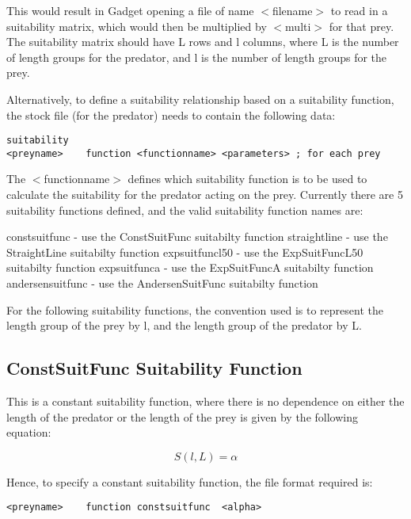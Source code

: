 \documentclass [a4paper, 10pt]{book}
\begin{document}
This would result in Gadget opening a file of name $<$filename$>$ to read in a suitability matrix, which would then be multiplied by $<$multi$>$ for that prey.  The suitability matrix should have L rows and l columns, where L is the number of length groups for the predator, and l is the number of length groups for the prey.

\bigskip
Alternatively, to define a suitability relationship based on a suitability function, the stock file (for the predator) needs to contain the following data:

{\small\begin{verbatim}
suitability
<preyname>    function <functionname> <parameters> ; for each prey
\end{verbatim}}

The $<$functionname$>$ defines which suitability function is to be used to calculate the suitability for the predator acting on the prey.  Currently there are 5 suitability functions defined, and the valid suitability function names are:

\bigskip
constsuitfunc - use the ConstSuitFunc suitabilty function\newline
straightline - use the StraightLine suitabilty function\newline
expsuitfuncl50 - use the ExpSuitFuncL50 suitabilty function\newline
expsuitfunca - use the ExpSuitFuncA suitabilty function\newline
andersensuitfunc - use the AndersenSuitFunc suitabilty function

\bigskip
For the following suitability functions, the convention used is to represent the length group of the prey by l, and the length group of the predator by L.

\subsection{ConstSuitFunc Suitability Function}
This is a constant suitability function, where there is no dependence on either the length of the predator or the length of the prey is given by the following equation:

\begin{equation}\label{eq:constsuit}
S(l, L) = \alpha
\end{equation}

Hence, to specify a constant suitability function, the file format required is:

{\small\begin{verbatim}
<preyname>    function constsuitfunc  <alpha>
\end{verbatim}}
\end{document}
